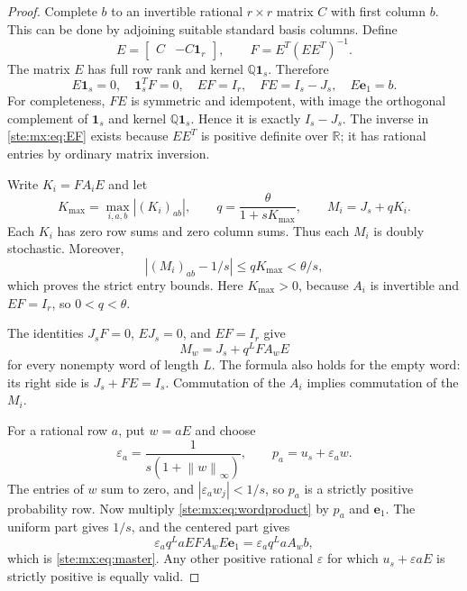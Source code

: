 \documentclass[11pt,letterpaper]{article}
\theoremstyle{definition}
\theoremstyle{remark}
\newcommand{\Q}{\mathbb Q}
\newcommand{\R}{\mathbb R}
\newcommand{\one}{\mathbf 1}
\newcommand{\norm}[1]{\left\lVert #1\right\rVert}
\newcommand{\e}{\mathbf e}
\begin{document}
\begin{proof}
Complete $b$ to an invertible rational $r\times r$ matrix $C$ with first
column $b$. This can be done by adjoining suitable standard basis columns.
Define
\begin{equation}\label{ste:mx:eq:EF}
 E=\begin{bmatrix}C&-C\one_r\end{bmatrix},\qquad
 F=E^T(EE^T)^{-1}.
\end{equation}
The matrix $E$ has full row rank and kernel $\Q\one_s$. Therefore
\begin{equation}\label{ste:mx:eq:EFidentities}
 E\one_s=0,\quad \one_s^TF=0,\quad EF=I_r,\quad
 FE=I_s-J_s,\quad E\e_1=b.
\end{equation}
For completeness, $FE$ is symmetric and idempotent, with image the orthogonal
complement of $\one_s$ and kernel $\Q\one_s$. Hence it is exactly $I_s-J_s$.
The inverse in \eqref{ste:mx:eq:EF} exists because $EE^T$ is positive definite over
$\R$; it has rational entries by ordinary matrix inversion.

Write $K_i=FA_iE$ and let
\begin{equation}\label{ste:mx:eq:qchoice}
 K_{\max}=\max_{i,a,b}|(K_i)_{ab}|,\qquad
 q=\frac{\theta}{1+sK_{\max}},\qquad M_i=J_s+qK_i.
\end{equation}
Each $K_i$ has zero row sums and zero column sums. Thus each $M_i$ is doubly
stochastic. Moreover,
\[
 |(M_i)_{ab}-1/s|\leq qK_{\max}<\theta/s,
\]
which proves the strict entry bounds. Here $K_{\max}>0$, because $A_i$ is
invertible and $EF=I_r$, so $0<q<\theta$.

The identities $J_sF=0$, $EJ_s=0$, and $EF=I_r$ give
\begin{equation}\label{ste:mx:eq:wordproduct}
 M_w=J_s+q^L F A_w E
\end{equation}
for every nonempty word of length $L$. The formula also holds for the empty
word: its right side is $J_s+FE=I_s$. Commutation of the $A_i$ implies
commutation of the $M_i$.

For a rational row $a$, put $w=aE$ and choose
\begin{equation}\label{ste:mx:eq:initial}
 \varepsilon_a=\frac{1}{s(1+\norm{w}_\infty)},\qquad
 p_a=u_s+\varepsilon_a w.
\end{equation}
The entries of $w$ sum to zero, and
$|\varepsilon_a w_j|<1/s$, so $p_a$ is a strictly positive probability row.
Now multiply \eqref{ste:mx:eq:wordproduct} by $p_a$ and $\e_1$. The uniform part gives
$1/s$, and the centered part gives
\[
 \varepsilon_a q^L aEF A_wE\e_1
   =\varepsilon_a q^L aA_wb,
\]
which is \eqref{ste:mx:eq:master}. Any other positive rational $\varepsilon$ for which
$u_s+\varepsilon aE$ is strictly positive is equally valid.


\end{proof}
\end{document}
